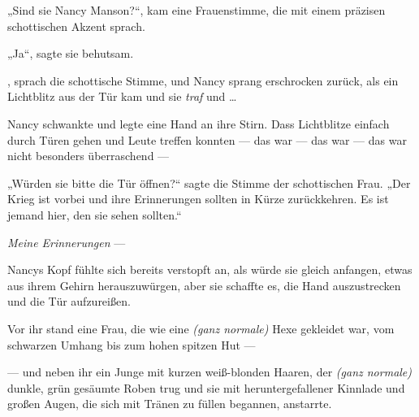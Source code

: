 „Sind sie Nancy Manson?“, kam eine Frauenstimme, die mit einem präzisen schottischen Akzent sprach.

„Ja“, sagte sie behutsam.

, sprach die schottische Stimme, und Nancy sprang erschrocken zurück, als ein Lichtblitz aus der Tür kam und sie \emph{traf} und …

Nancy schwankte und legte eine Hand an ihre Stirn. Dass Lichtblitze einfach durch Türen gehen und Leute treffen konnten — das war — das war — das war nicht besonders überraschend —

„Würden sie bitte die Tür öffnen?“ sagte die Stimme der schottischen Frau.
„Der Krieg ist vorbei und ihre Erinnerungen sollten in Kürze zurückkehren. Es ist jemand hier, den sie sehen sollten.“

\emph{Meine Erinnerungen} —

Nancys Kopf fühlte sich bereits verstopft an, als würde sie gleich anfangen, etwas aus ihrem Gehirn herauszuwürgen, aber sie schaffte es, die Hand auszustrecken und die Tür aufzureißen.

Vor ihr stand eine Frau, die wie eine \emph{(ganz normale)} Hexe gekleidet war, vom schwarzen Umhang bis zum hohen spitzen Hut —

— und neben ihr ein Junge mit kurzen weiß-blonden Haaren, der \emph{(ganz normale)} dunkle, grün gesäumte Roben trug und sie mit heruntergefallener Kinnlade und großen Augen, die sich mit Tränen zu füllen begannen, anstarrte.

